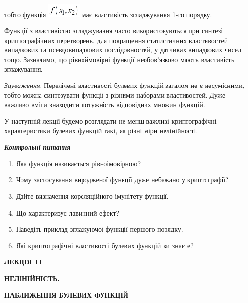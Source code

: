 \documentclass[a4paper]{article}
\newcommand\liststyleWWviiiNumxxv{%
\renewcommand\theenumi{\arabic{enumi}}
\renewcommand\theenumii{\alph{enumii}}
\renewcommand\theenumiii{\roman{enumiii}}
\renewcommand\theenumiv{\arabic{enumiv}}
\renewcommand\labelenumi{\theenumi.}
\renewcommand\labelenumii{\theenumii.}
\renewcommand\labelenumiii{\theenumiii.}
\renewcommand\labelenumiv{\theenumiv.}
}
\newcounter{}
\begin{document}
тобто функція 
\includegraphics[width=0.6665in,height=0.278in]{crypt-img/crypt-img255.png} 
має властивість згладжування 1-го порядку.

Функції з властивістю згладжування часто використовуються при синтезі
криптографічних перетворень, для покращення статистичних властивостей
випадкових та псевдовипадкових послідовностей, у датчиках випадкових чисел
тощо. Зазначимо, що рівноймовірні функції необов’язково мають  властивість
зглажування. 

\textit{Зауваження}. Перелічені властивості булевих функцій загалом не є
несумісними, тобто можна синтезувати функції з різними наборами властивостей.
Дуже важливо вміти знаходити потужність відповідних множин функцій. 

У наступній лекції будемо розглядати не менш важливі криптографічні
характеристики булевих функцій такі, як різні міри нелінійності.  


\bigskip

{\centering\bfseries\itshape
Контрольні питання 
\par}


\bigskip


\bigskip

\liststyleWWviiiNumxxv
\begin{enumerate}
\item Яка функція називається рівноімовірною?
\item Чому застосування  виродженої функції дуже небажано у криптографії? 
\item Дайте визначення кореляційного імунітету функції.
\item Що характеризує лавинний ефект?
\item Наведіть приклад зглажуючої функції першого порядку.
\item Які криптографічні властивості булевих функцій ви знаєте? 
\end{enumerate}

\bigskip


\bigskip


\bigskip


\bigskip

{\bfseries
ЛЕКЦІЯ  11}


\bigskip

{\centering\bfseries
НЕЛІНІЙНІСТЬ.
\par}

{\centering\bfseries
 НАБЛИЖЕННЯ  БУЛЕВИХ  ФУНКЦІЙ 
\par}
\end{document}
